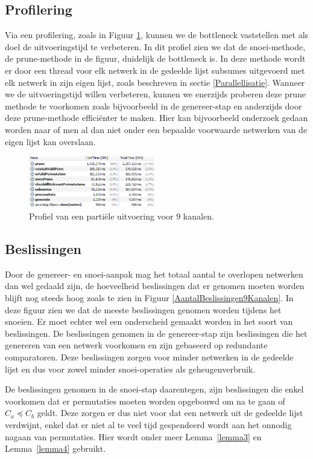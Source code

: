 \documentclass{article}
\begin{document}
\subsection{Profilering}\label{Profilering}
Via een profilering, zoals in Figuur \ref{ProfileTime9}, kunnen we de bottleneck vaststellen met als doel de uitvoeringstijd te verbeteren.
In dit profiel zien we dat de snoei-methode, de prune-methode in de figuur, duidelijk de bottleneck is.
In deze methode wordt er door een thread voor elk netwerk in de gedeelde lijst subsumes uitgevoerd met elk netwerk in zijn eigen lijst, zoals beschreven in sectie \ref{Parallellisatie}.
Wanneer we de uitvoeringstijd willen verbeteren, kunnen we enerzijds proberen deze prune methode te voorkomen zoals bijvoorbeeld in de genereer-stap en anderzijds door deze prune-methode effici\"enter te maken.
Hier kan bijvoorbeeld onderzoek gedaan worden naar of men al dan niet onder een bepaalde voorwaarde netwerken van de eigen lijst kan overslaan.
\begin{figure}[!h]
\centering
\vspace{10pt}
\includegraphics[width=0.49\textwidth]{Profile_Time_9.png}
\caption{Profiel van een parti\"ele uitvoering voor $9$ kanalen.}
\label{ProfileTime9}
\end{figure}

\subsection{Beslissingen}
Door de genereer- en snoei-aanpak mag het totaal aantal te overlopen netwerken dan wel gedaald zijn, de hoeveelheid beslissingen dat er genomen moeten worden blijft nog steeds hoog zoals te zien in Figuur \ref{AantalBeslissingen9Kanalen}.
In deze figuur zien we dat de meeste beslissingen genomen worden tijdens het snoeien.
Er moet echter wel een onderscheid gemaakt worden in het soort van beslissingen.
De beslissingen genomen in de genereer-stap zijn beslissingen die het genereren van een netwerk voorkomen en zijn gebaseerd op redundante comparatoren.
Deze beslissingen zorgen voor minder netwerken in de gedeelde lijst en dus voor zowel minder snoei-operaties als geheugenverbruik.

De beslissingen genomen in de snoei-stap daarentegen, zijn beslissingen die enkel voorkomen dat er permutaties moeten worden opgebouwd om na te gaan of $C_a \preceq C_b$ geldt.
Deze zorgen er dus niet voor dat een netwerk uit de gedeelde lijst verdwijnt, enkel dat er niet al te veel tijd gespendeerd wordt aan het onnodig nagaan van permutaties.
Hier wordt onder meer Lemma~\ref{lemma3} en Lemma~\ref{lemma4} gebruikt.
\end{document}
